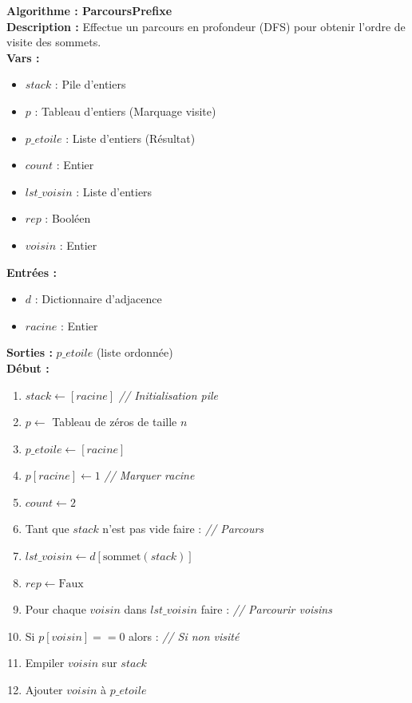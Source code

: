\documentclass[a4paper, 12pt]{article}
\begin{document}
\begin{tcolorbox}[colback=darkWhite!75!white,colframe=black!30,left=5pt,right=5pt,top=5pt,bottom=5pt]
\textbf{Algorithme : ParcoursPrefixe} \\
\textbf{Description :} Effectue un parcours en profondeur (DFS) pour obtenir l'ordre de visite des sommets. \\
\textbf{Vars :}
\begin{itemize}
    \item $stack$ : Pile d'entiers
    \item $p$ : Tableau d'entiers (Marquage visite)
    \item $p\_etoile$ : Liste d'entiers (Résultat)
    \item $count$ : Entier
    \item $lst\_voisin$ : Liste d'entiers
    \item $rep$ : Booléen
    \item $voisin$ : Entier
\end{itemize}
\textbf{Entrées :}
\begin{itemize}
    \item $d$ : Dictionnaire d'adjacence
    \item $racine$ : Entier
\end{itemize}
\textbf{Sorties :} $p\_etoile$ (liste ordonnée) \\
\textbf{Début :}
\begin{enumerate}
    \item $stack \leftarrow [racine]$ \textit{// Initialisation pile}
    \item $p \leftarrow$ Tableau de zéros de taille $n$
    \item $p\_etoile \leftarrow [racine]$
    \item $p[racine] \leftarrow 1$ \textit{// Marquer racine}
    \item $count \leftarrow 2$
    \item Tant que $stack$ n'est pas vide faire : \textit{// Parcours}
    \item \quad $lst\_voisin \leftarrow d[\text{sommet}(stack)]$
    \item \quad $rep \leftarrow \text{Faux}$
    \item \quad Pour chaque $voisin$ dans $lst\_voisin$ faire : \textit{// Parcourir voisins}
    \item \quad \quad Si $p[voisin] == 0$ alors : \textit{// Si non visité}
    \item \quad \quad \quad Empiler $voisin$ sur $stack$
    \item \quad \quad \quad Ajouter $voisin$ à $p\_etoile$

\end{enumerate}
\end{tcolorbox}
\end{document}
